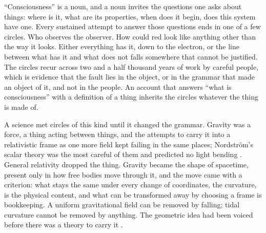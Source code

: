 ``Consciousness'' is a noun, and a noun invites the questions one asks about things: where is it, what
are its properties, when does it begin, does this system have one. Every sustained attempt to answer
those questions ends in one of a few circles. Who observes the observer. How could red look like
anything other than the way it looks. Either everything has it, down to the electron, or the line
between what has it and what does not falls somewhere that cannot be justified. The circles recur
across two and a half thousand years of work by careful people, which is evidence that the fault lies
in the object, or in the grammar that made an object of it, and not in the people. An account that
answers ``what is consciousness'' with a definition of a thing inherits the circles whatever the thing
is made of.

A science met circles of this kind until it changed the grammar. Gravity was a force, a thing acting
between things, and the attempts to carry it into a relativistic frame as one more field kept failing
in the same places; Nordström's scalar theory was the most careful of them and predicted no light
bending \citep{norton1992}. General relativity dropped the thing. Gravity became the shape of
spacetime, present only in how free bodies move through it, and the move came with a criterion: what
stays the same under every change of coordinates, the curvature, is the physical content, and what can
be transformed away by choosing a frame is bookkeeping. A uniform gravitational field can be removed by
falling; tidal curvature cannot be removed by anything. The geometric idea had been voiced before there
was a theory to carry it \citep{riemann1873,clifford1876}.

